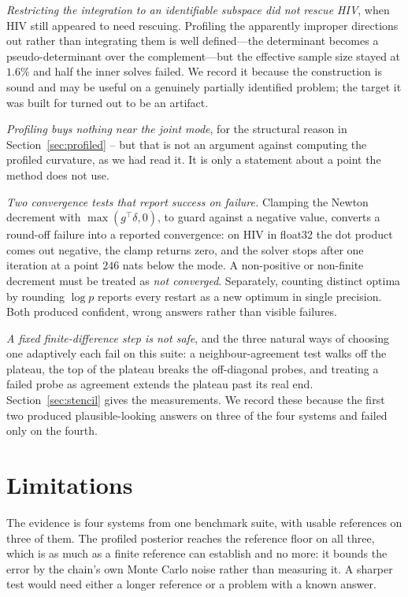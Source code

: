 \documentclass[11pt]{article}
\theoremstyle{plain}
\theoremstyle{definition}
\theoremstyle{remark}
\begin{document}
\emph{Restricting the integration to an identifiable subspace did not rescue HIV}, when HIV still
appeared to need rescuing. Profiling the apparently improper directions out rather than integrating
them is well defined---the determinant becomes a pseudo-determinant over the complement---but the
effective sample size stayed at $1.6\%$ and half the inner solves failed. We record it because the
construction is sound and may be useful on a genuinely partially identified problem; the target it
was built for turned out to be an artifact.

\emph{Profiling buys nothing near the joint mode}, for the structural reason in
Section~\ref{sec:profiled} -- but that is not an argument against computing the profiled curvature,
as we had read it. It is only a statement about a point the method does not use.

\emph{Two convergence tests that report success on failure.} Clamping the Newton decrement with
$\max(g^\top\delta, 0)$, to guard against a negative value, converts a round-off failure into a
reported convergence: on HIV in float32 the dot product comes out negative, the clamp returns
zero, and the solver stops after one iteration at a point $246$ nats below the mode. A
non-positive or non-finite decrement must be treated as \emph{not converged}. Separately, counting
distinct optima by rounding $\log p$ reports every restart as a new optimum in single precision.
Both produced confident, wrong answers rather than visible failures.

\emph{A fixed finite-difference step is not safe}, and the three natural ways of choosing one
adaptively each fail on this suite: a neighbour-agreement test walks off the plateau, the top of
the plateau breaks the off-diagonal probes, and treating a failed probe as agreement extends the
plateau past its real end. Section~\ref{sec:stencil} gives the measurements. We record these
because the first two produced plausible-looking answers on three of the four systems and failed
only on the fourth.

\section{Limitations}

The evidence is four systems from one benchmark suite, with usable references on three of them.
The profiled posterior reaches the reference floor on all three, which is as much as a finite
reference can establish and no more: it bounds the error by the chain's own Monte Carlo noise
rather than measuring it. A sharper test would need either a longer reference or a problem with a
known answer.
\end{document}
